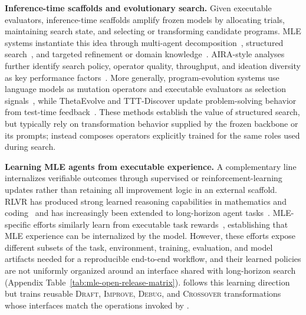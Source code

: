 \textbf{Inference-time scaffolds and evolutionary search.}
Given executable evaluators, inference-time scaffolds amplify frozen models by allocating trials, maintaining search state, and selecting or transforming candidate programs.
MLE systems instantiate this idea through multi-agent decomposition~\citep{trirat2024automlagent,gandhi2024budgetmlagent,li2025autokaggle,fang2025mlzero}, structured search~\citep{jiang2025aide,chi2024sela}, and targeted refinement or domain knowledge~\citep{liu2025ml,ou2025automind,nam2025mlestar,du2025automlgen,zhang2025deepanalyze}.
AIRA-style analyses further identify search policy, operator quality, throughput, and ideation diversity as key performance factors~\citep{toledo2025airesearchagents,audranreiss2025ideationdiversity,hambardzumyan2026aira_2}.
More generally, program-evolution systems use language models as mutation operators and executable evaluators as selection signals~\citep{novikov2025alphaevolve,lange2025shinkaevolve,cemri2026adaevolve,ye2026evaluation}, while ThetaEvolve and TTT-Discover update problem-solving behavior from test-time feedback~\citep{wang2025thetaevolve,yuksekgonul2026learning}.
These methods establish the value of structured search, but typically rely on transformation behavior supplied by the frozen backbone or its prompts; \openmleevo{} instead composes operators explicitly trained for the same roles used during search.

\textbf{Learning MLE agents from executable experience.}
A complementary line internalizes verifiable outcomes through supervised or reinforcement-learning updates rather than retaining all improvement logic in an external scaffold.
RLVR has produced strong learned reasoning capabilities in mathematics and coding~\citep{guo2025deepseek,team2025kimi,zeng2025rlve} and has increasingly been extended to long-horizon agent tasks~\citep{team2026kimi,zeng2026glm,minimax2026m27}.
MLE-specific efforts similarly learn from executable task rewards~\citep{liu2025mlagent,li2025mlerl,yang2025rlmleagents,cai2026acegrpo}, establishing that MLE experience can be internalized by the model.
However, these efforts expose different subsets of the task, environment, training, evaluation, and model artifacts needed for a reproducible end-to-end workflow, and their learned policies are not uniformly organized around an interface shared with long-horizon search (Appendix Table~\ref{tab:mle-open-release-matrix}).
\openmleerl{} follows this learning direction but trains reusable \textsc{Draft}, \textsc{Improve}, \textsc{Debug}, and \textsc{Crossover} transformations whose interfaces match the operations invoked by \openmleevo{}.

